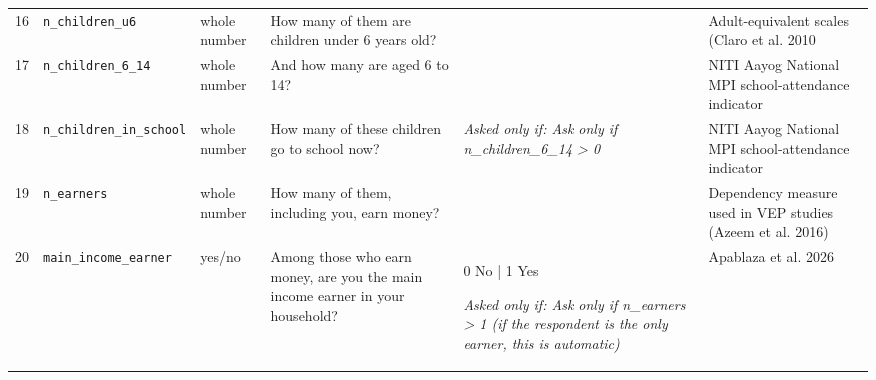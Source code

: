 \documentclass[9pt,a4paper,landscape]{article}
\begin{document}
\begin{longtable}{@{}p{0.5cm}p{3.3cm}p{1.7cm}p{7.3cm}p{5.6cm}p{5.4cm}@{}}
\footnotesize 16 & \footnotesize\texttt{n\_children\_u6} & \scriptsize whole number & \footnotesize How many of them are children under 6 years old?\par\vspace{1pt}{\footnotesize\color{hdr}{\hifont इनमें 6 साल से छोटे बच्चे कितने हैं?}} & \scriptsize  & \scriptsize Adult-equivalent scales (Claro et al. 2010\\
\footnotesize 17 & \footnotesize\texttt{n\_children\_6\_14} & \scriptsize whole number & \footnotesize And how many are aged 6 to 14?\par\vspace{1pt}{\footnotesize\color{hdr}{\hifont और 6 से 14 साल के कितने हैं?}} & \scriptsize  & \scriptsize NITI Aayog National MPI school-attendance indicator\\
\footnotesize 18 & \footnotesize\texttt{n\_children\_in\_school} & \scriptsize whole number & \footnotesize How many of these children go to school now?\par\vspace{1pt}{\footnotesize\color{hdr}{\hifont इनमें से कितने बच्चे अभी स्कूल जाते हैं?}} & \scriptsize \textit{Asked only if: Ask only if n\_children\_6\_14 > 0} & \scriptsize NITI Aayog National MPI school-attendance indicator\\
\footnotesize 19 & \footnotesize\texttt{n\_earners} & \scriptsize whole number & \footnotesize How many of them, including you, earn money?\par\vspace{1pt}{\footnotesize\color{hdr}{\hifont इनमें से कितने लोग, आपको मिलाकर, पैसा कमाते हैं?}} & \scriptsize  & \scriptsize Dependency measure used in VEP studies (Azeem et al. 2016)\\
\footnotesize 20 & \footnotesize\texttt{main\_income\_earner} & \scriptsize yes/no & \footnotesize Among those who earn money, are you the main income earner in your household?\par\vspace{1pt}{\footnotesize\color{hdr}{\hifont जो लोग कमाते हैं, उनमें सबसे ज़्यादा कमाने वाले आप ही हैं?}} & \scriptsize 0 No | 1 Yes\par\vspace{1pt}\textit{Asked only if: Ask only if n\_earners > 1 (if the respondent is the only earner, this is automatic)} & \scriptsize Apablaza et al. 2026\\
\bottomrule\end{longtable}\vspace{6pt}
\\[3pt]
\end{document}

